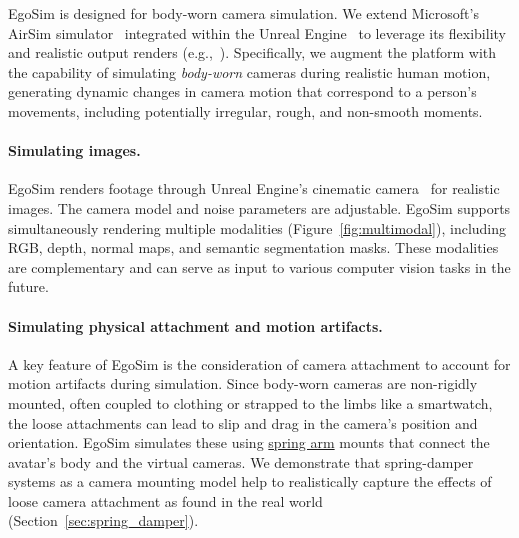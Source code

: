 EgoSim is designed for body-worn camera simulation.
We extend Microsoft's AirSim simulator~\cite{shah2018airsim} integrated within the Unreal Engine~\cite{unrealengine} to leverage its flexibility and realistic output renders (e.g.,~\cite{bedlam, yang2023synbody}).
Specifically, we augment the platform with the capability of simulating \emph{body-worn} cameras during realistic human motion, generating dynamic changes in camera motion that correspond to a person's movements, including potentially irregular, rough, and non-smooth moments.



\paragraph{Simulating images.}
EgoSim renders footage through Unreal Engine's cinematic camera~\cite{pueyo2020cinemairsim} for realistic images.
The camera model and noise parameters are adjustable. 
EgoSim supports simultaneously rendering multiple modalities (Figure~\ref{fig:multimodal}), including RGB, depth, normal maps, and semantic segmentation masks.
These modalities are complementary and can serve as input to various computer vision tasks in the future.

\paragraph{Simulating physical attachment and motion artifacts.}
A key feature of EgoSim is the consideration of camera attachment to account for motion artifacts during simulation.
Since body-worn cameras are non-rigidly mounted, often coupled to clothing or strapped to the limbs like a smartwatch, the loose attachments can lead to slip and drag in the camera's position and orientation.
EgoSim simulates these using \href{https://dev.epicgames.com/documentation/en-us/unreal-engine/using-spring-arm-components-in-unreal-engine}{spring arm} mounts that connect the avatar's body and the virtual cameras. 
We demonstrate that spring-damper systems as a camera mounting model help to realistically capture the effects of loose camera attachment as found in the real world (Section~\ref{sec:spring_damper}).

